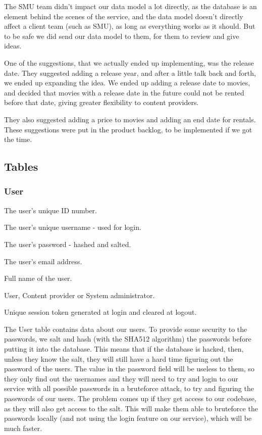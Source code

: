 The SMU team didn't impact our data model a lot directly, as the database is an element behind the scenes of the service, and the data model doesn't directly affect a client team (such as SMU), as long as everything works as it should. But to be safe we did send our data model to them, for them to review and give ideas.

One of the suggestions, that we actually ended up implementing, was the release date. They suggested adding a release year, and after a little talk back and forth, we ended up expanding the idea. We ended up adding a release date to movies, and decided that movies with a release date in the future could not be rented before that date, giving greater flexibility to content providers.

They also suggested adding a price to movies and adding an end date for rentals. These suggestions were put in the product backlog, to be implemented if we got the time.

\subsection{Tables}
\label{Design_Database_Tables}

\subsubsection{User}
\label{Design_Database_Tables_User}

\begin{my_description}
\item[user\_id] The user's unique ID number.
\item[username] The user's unique username - used for login.
\item[password] The user's password - hashed and salted.
\item[email] The user's email address.
\item[full\_name] Full name of the user.
\item[type] User, Content provider or System administrator.
\item[token] Unique session token generated at login and cleared at logout.
\end{my_description}

The User table contains data about our users. To provide some security to the passwords, we salt and hash (with the SHA512 algorithm) the passwords before putting it into the database. This means that if the database is hacked, then, unless they know the salt, they will still have a hard time figuring out the password of the users. The value in the password field will be useless to them, so they only find out the usernames and they will need to try and login to our service with all possible passwords in a bruteforce attack, to try and figuring the passwords of our users. The problem comes up if they get access to our codebase, as they will also get access to the salt. This will make them able to bruteforce the passwords locally (and not using the login feature on our service), which will be much faster.

